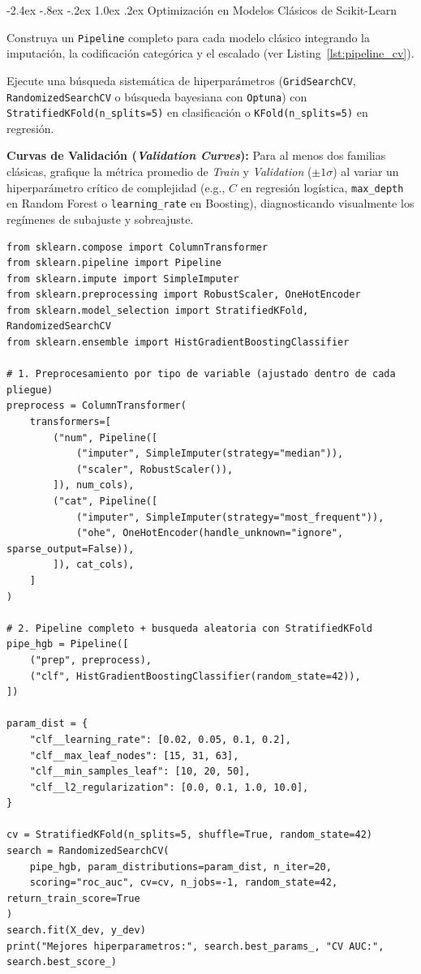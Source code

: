 \documentclass[11pt,a4paper]{article}
\makeatletter
\renewcommand\subsection{\@startsection{subsection}{2}{\z@}%
  {-2.4ex \@plus -.8ex \@minus -.2ex}%
  {1.0ex \@plus .2ex}%
  {\color{BlueAccent}\normalfont\large\bfseries}}
\let\origenumerate\enumerate
\let\endorigenumerate\endenumerate
\renewenvironment{enumerate}{\origenumerate\setlength{\itemsep}{2pt}\setlength{\parskip}{0pt}\setlength{\parsep}{0pt}}{\endorigenumerate}
\makeatother
\begin{document}
\subsection{Optimización en Modelos Clásicos de Scikit-Learn}
\begin{enumerate}
    \item Construya un \texttt{Pipeline} completo para cada modelo clásico integrando la imputación, la codificación categórica y el escalado (ver Listing~\ref{lst:pipeline_cv}).
    \item Ejecute una búsqueda sistemática de hiperparámetros (\texttt{GridSearchCV}, \texttt{RandomizedSearchCV} o búsqueda bayesiana con \texttt{Optuna}) con \texttt{StratifiedKFold(n\_splits=5)} en clasificación o \texttt{KFold(n\_splits=5)} en regresión.
    \item \textbf{Curvas de Validación (\textit{Validation Curves}):} Para al menos dos familias clásicas, grafique la métrica promedio de \textit{Train} y \textit{Validation} ($\pm 1\sigma$) al variar un hiperparámetro crítico de complejidad (e.g., $C$ en regresión logística, \texttt{max\_depth} en Random Forest o \texttt{learning\_rate} en Boosting), diagnosticando visualmente los regímenes de subajuste y sobreajuste.
\end{enumerate}

\begin{lstlisting}[caption={Pipeline sin fuga de datos y optimizacion conjunta de hiperparametros con CV en Scikit-Learn.}, label={lst:pipeline_cv}]
from sklearn.compose import ColumnTransformer
from sklearn.pipeline import Pipeline
from sklearn.impute import SimpleImputer
from sklearn.preprocessing import RobustScaler, OneHotEncoder
from sklearn.model_selection import StratifiedKFold, RandomizedSearchCV
from sklearn.ensemble import HistGradientBoostingClassifier

# 1. Preprocesamiento por tipo de variable (ajustado dentro de cada pliegue)
preprocess = ColumnTransformer(
    transformers=[
        ("num", Pipeline([
            ("imputer", SimpleImputer(strategy="median")),
            ("scaler", RobustScaler()),
        ]), num_cols),
        ("cat", Pipeline([
            ("imputer", SimpleImputer(strategy="most_frequent")),
            ("ohe", OneHotEncoder(handle_unknown="ignore", sparse_output=False)),
        ]), cat_cols),
    ]
)

# 2. Pipeline completo + busqueda aleatoria con StratifiedKFold
pipe_hgb = Pipeline([
    ("prep", preprocess),
    ("clf", HistGradientBoostingClassifier(random_state=42)),
])

param_dist = {
    "clf__learning_rate": [0.02, 0.05, 0.1, 0.2],
    "clf__max_leaf_nodes": [15, 31, 63],
    "clf__min_samples_leaf": [10, 20, 50],
    "clf__l2_regularization": [0.0, 0.1, 1.0, 10.0],
}

cv = StratifiedKFold(n_splits=5, shuffle=True, random_state=42)
search = RandomizedSearchCV(
    pipe_hgb, param_distributions=param_dist, n_iter=20,
    scoring="roc_auc", cv=cv, n_jobs=-1, random_state=42, return_train_score=True
)
search.fit(X_dev, y_dev)
print("Mejores hiperparametros:", search.best_params_, "CV AUC:", search.best_score_)
\end{lstlisting}
\end{document}
